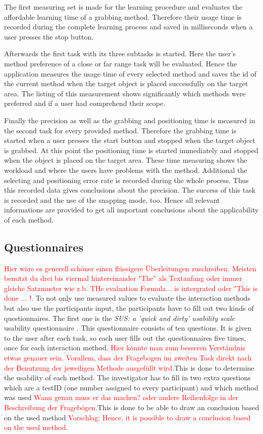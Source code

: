 The first measuring set is made for the learning procedure and evaluates the affordable learning time of a grabbing method. Therefore their usage time is recorded during the complete learning process and saved in milliseconds when a user presses the stop button. 

Afterwards the first task with its three subtasks is started. Here the user's method preference of a close or far range task will be evaluated. Hence the application measures the usage time of every selected method and saves the id of the current method when the target object is placed successfully on the target area. The listing of this measurement shows significantly which methods were preferred and if a user had comprehend their scope.  

Finally the precision as well as the grabbing and positioning time is measured in the second task for every provided method. Therefore the grabbing time is started when a user presses the start button and stopped when the target object is grabbed. At this point the positioning time is started immediately and stopped when the object is placed on the target area. These time measuring  shows the workload and where the users have problems with the method. Additional the selecting and positioning error rate is recorded during the whole process. Thus this recorded data gives conclusions about the precision. The success of this task is recorded and the use of the snapping mode, too. Hence all relevant informations are provided to get all important conclusions about the applicability of each method. 

\subsection{Questionnaires} \label{sec:questionnaires}

\textcolor{red}{Hier wäre es generell schöner einen flüssigere Überleitungen zuschreiben. Meisten benutzt du drei bis viermal hintereinander "The" als Textanfang oder immer gleiche Satzmuster wie z.b. THe evaluation Formula... is intergrated oder "This is done ... !. }
To not only use measured values to evaluate the interaction methods but also use the participants input, the participants have to fill out two kinds of questionnaires. The first one is the \textit{SUS: a 'quick and dirty' usability scale} usability questionnaire \citep{6sus}. This questionnaire consists of ten questions. It is given to the user after each task, so each user fills out the questionnaires five times, once for each interaction method. \textcolor{red}{Hier könnte man zum besseren Verständnis etwas genauer sein. Vorallem, dass der Fragebogen im zweiten Task direkt nach der Benutzung der jeweiligen Methode ausgefüllt wird.}This is done to determine the usability of each method. The investigator has to fill in two extra questions which are a testID (one number assigned to every participant) and which method was used \textcolor{red}{Wann genau muss er das machen? oder andere Reihenfolge in der Beschreibung der Fragebögen}.This is done to be able to draw an conclusion based on the used method \textcolor{red}{Vorschlag: Hence, it is possible to draw a conclusion based on the used method.}  \\ 

